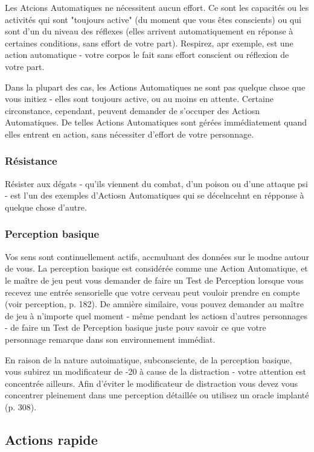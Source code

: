 Les Atcions Automatiques ne nécessitent aucun effort. Ce sont les capacités ou les activités qui sont "toujours active" (du moment que vous êtes conscients) ou qui sont d'un du niveau des réflexes (elles arrivent automatiquement en réponse à certaines conditions, sans effort de votre part). Respirez, apr exemple, est une action automatique - votre corpos le fait sans effort conscient ou réflexion de votre part. 

Dans la plupart des cas, les Actions Automatiques ne sont pas quelque chsoe que vous initiez - elles sont toujours active, ou au moins en attente. Certaine circonstance, cependant, peuvent demander de s'occuper des Actiosn Automatiques. De telles Actions Automatiques sont gérées immédiatement quand elles entrent en action, sans nécessiter d'effort de votre personnage. 

\subsubsection{Résistance} 

Résister aux dégats - qu'ils viennent du combat, d'un poison ou d'une attaque psi - est l'un des exemples d'Actiosn Automatiques qui se décelncehnt en répponse à quelque chose d'autre. 

\subsubsection{Perception basique} 

Vos sens sont continuellement actifs, accmuluant des données sur le modne autour de vous. La perception basique est considérée comme une Action Automatique, et le maître de jeu peut vous demander de faire un Test de Perception lorsque vous recevez une entrée sensorielle que votre cerveau peut vouloir prendre en compte (voir perception, p. 182). De amnière similaire, vous pouvez demander au maître de jeu à n'importe quel moment - même pendant les actiosn d'autres personnages - de faire un Test de Perception basique juste pouv savoir ce que votre personnage remarque dans son environnement immédiat. 

En raison de la nature autoimatique, subconsciente, de la perception basique, vous subirez un modificateur de -20 à cause de la distraction - votre attention est concentrée ailleurs. Afin d'éviter le modificateur de distraction vous devez vous concentrer pleinement dans une perception détaillée ou utilisez un oracle implanté (p. 308). 

\subsection{Actions rapide} \label{sec:combat-quick-actions} 

